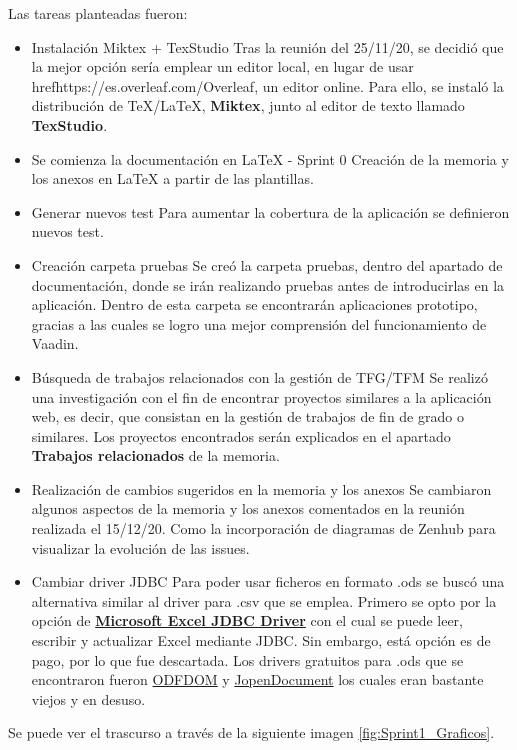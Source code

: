 Las tareas planteadas fueron:
\begin{itemize}
	\tightlist
	\item Instalación Miktex + TexStudio
		Tras la reunión del 25/11/20, se decidió que la mejor opción sería emplear un editor local, en lugar de usar href{https://es.overleaf.com/}{Overleaf}, un editor online. Para ello, se instaló la distribución de TeX/LaTeX, \textbf{Miktex}, junto al editor de texto llamado \textbf{TexStudio}.
	\item Se comienza la documentación en LaTeX  - Sprint 0
		Creación de la memoria y los anexos en LaTeX a partir de las plantillas.
	\item Generar nuevos test
		Para aumentar la cobertura de la aplicación se definieron nuevos test.
	\item Creación carpeta pruebas
		Se creó la carpeta pruebas, dentro del apartado de documentación, donde se irán realizando pruebas antes de introducirlas en la aplicación. Dentro de esta carpeta se encontrarán aplicaciones prototipo, gracias a las cuales se logro una mejor comprensión del funcionamiento de Vaadin.
	\item Búsqueda de trabajos relacionados con la gestión de TFG/TFM
		Se realizó una investigación con el fin de encontrar proyectos similares a la aplicación web, es decir, que consistan en la gestión de trabajos de fin de grado o similares. Los proyectos encontrados serán explicados en el apartado \textbf{Trabajos relacionados} de la memoria.
	\item Realización de cambios sugeridos en la memoria y los anexos
		Se cambiaron algunos aspectos de la memoria y los anexos comentados en la reunión realizada el 15/12/20. Como la incorporación de diagramas de Zenhub para visualizar la evolución de las issues.
	\item Cambiar driver JDBC 
		Para poder usar ficheros en formato .ods se buscó una alternativa similar al driver para .csv que se emplea. Primero se opto por la opción de \textbf{\href{https://www.cdata.com/drivers/excel/jdbc/}{Microsoft Excel JDBC Driver}} con el cual se puede leer, escribir y actualizar Excel mediante JDBC. Sin embargo, está opción es de pago, por lo que fue descartada. Los drivers gratuitos para .ods que se encontraron fueron \href{https://odftoolkit.org/}{ODFDOM} y \href{http://www.jopendocument.org/}{JopenDocument} los cuales eran bastante viejos y en desuso. 
\end{itemize}

Se puede ver el trascurso a través de la siguiente imagen \ref{fig:Sprint1_Graficos}.

